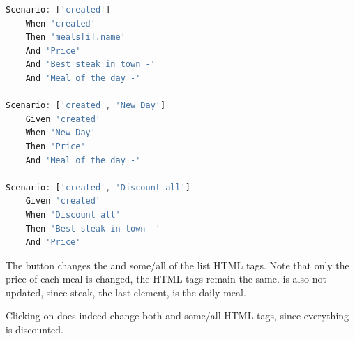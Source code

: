 \label{eval:scenarios_meal}
\begin{lstlisting}[language=JavaScript,   basicstyle=\fontsize{9}{9}\selectfont\ttfamily,
    caption = {Chosen scenarios of the Menu with Daily Meal application}, captionpos=b]
Scenario: ['created']
	When 'created'
	Then 'meals[i].name'
	And 'Price'
	And 'Best steak in town -'
	And 'Meal of the day -'

Scenario: ['created', 'New Day']
	Given 'created'
	When 'New Day'
	Then 'Price'
	And 'Meal of the day -'

Scenario: ['created', 'Discount all']
	Given 'created'
	When 'Discount all'
	Then 'Best steak in town -'
	And 'Price'
\end{lstlisting}

The  button changes the  and some/all of the  list HTML tags. Note that only the price of each meal is changed, the  HTML tags remain the same.  is also not updated, since steak, the last element, is the daily meal. 

Clicking on  does indeed change both  and some/all  HTML tags, since everything is discounted.
